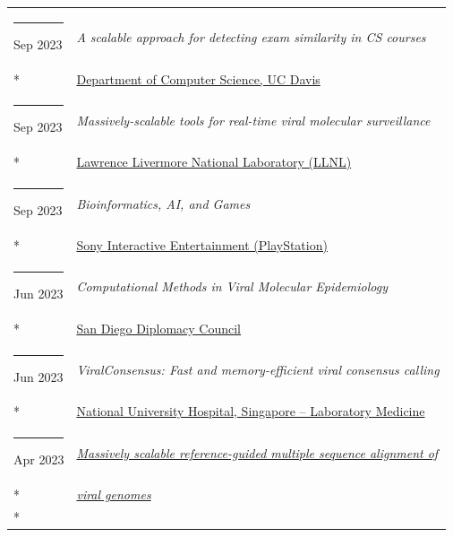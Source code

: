 \documentclass[margin,line]{res}
\begin{document}
\begin{resume}
\begin{longtable}{@{}p{0.7in}p{4in}}
\hspace*{-4mm} \rule{-1mm}{5mm} Sep 2023 & \textit{A scalable approach for detecting exam similarity in CS courses}\\*
\hspace*{-4mm} & \hspace{4mm} \href{https://cs.ucdavis.edu/}{Department of Computer Science, UC Davis}\\
\hspace*{-4mm} \rule{-1mm}{5mm} Sep 2023 & \textit{Massively-scalable tools for real-time viral molecular surveillance}\\*
\hspace*{-4mm} & \hspace{4mm} \href{https://llnl.gov/}{Lawrence Livermore National Laboratory (LLNL)}\\
\hspace*{-4mm} \rule{-1mm}{5mm} Sep 2023 & \textit{Bioinformatics, AI, and Games}\\*
\hspace*{-4mm} & \hspace{4mm} \href{https://sonyinteractive.com/}{Sony Interactive Entertainment (PlayStation)}\\
\hspace*{-4mm} \rule{-1mm}{5mm} Jun 2023 & \textit{Computational Methods in Viral Molecular Epidemiology}\\*
\hspace*{-4mm} & \hspace{4mm} \href{https://sandiegodiplomacy.org/}{San Diego Diplomacy Council}\\
\hspace*{-4mm} \rule{-1mm}{5mm} Jun 2023 & \textit{ViralConsensus: Fast and memory-efficient viral consensus calling}\\*
\hspace*{-4mm} & \hspace{4mm} \href{https://www.nuh.com.sg/our-services/Specialties/Laboratory-Medicine/Pages/default.aspx}{National University Hospital, Singapore -- Laboratory Medicine}\\
\hspace*{-4mm} \rule{-1mm}{5mm} Apr 2023 & \href{https://doi.org/10.7916/kdj9-2t95}{\textit{Massively scalable reference-guided multiple sequence alignment of}}\\*
\hspace*{-4mm} & \hspace{4mm} \href{https://doi.org/10.7916/kdj9-2t95}{\textit{viral genomes}}\\*

\end{longtable}
\end{resume}
\end{document}
